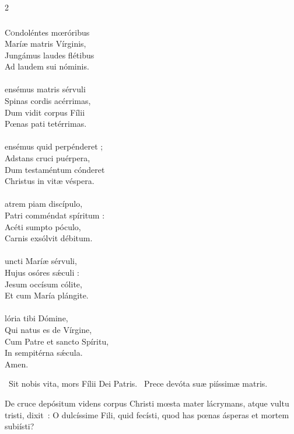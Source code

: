 \documentclass[9pt,twoside]{extarticle}
\begin{document}
\begin{multicols}{2}
{\subsubsection*{\center {}}
\lettrine{C}ondoléntes mœróribus\\
Maríæ matris Vírginis,\\
Jungámus laudes flétibus\\
Ad laudem sui nóminis.\\
\\
ensémus matris sérvuli\\
Spinas cordis acérrimas,\\
Dum vidit corpus Fílii\\
Pœnas pati tetérrimas.\\
\\
ensémus quid perpénderet ;\\
Adstans cruci puérpera,\\
Dum testaméntum cónderet\\
Christus in vitæ véspera.\\
\\
atrem piam discípulo,\\
Patri comméndat spíritum :\\
Acéti sumpto póculo,\\
Carnis exsólvit débitum.\\
\\
uncti Maríæ sérvuli,\\
Hujus osóres sǽculi :\\
Jesum occísum cólite,\\
Et cum María plángite.\\
\\
lória tibi Dómine,\\
Qui natus es de Vírgine,\\
Cum Patre et sancto Spíritu,\\
In sempitérna sǽcula.\\
Amen.

\begin{tightlist}{}
\item {}~Sit nobis vita, mors Fílii Dei Patris. ~Prece devóta suæ piíssimæ matris.
\item {} De cruce depósitum videns corpus Christi mœsta mater lácrymans, atque vultu tristi, dixit~: O dulcíssime Fili, quid fecísti, quod has pœnas ásperas et mortem subiísti?
\end{tightlist}

}
\end{multicols}
\end{document}
